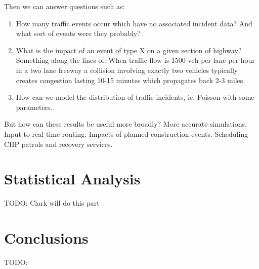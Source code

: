 \documentclass[12pt]{article}
\begin{document}
Then we can answer questions such as:
\begin{enumerate}
    \item How many traffic events occur which have no associated incident
        data? And what sort of events were they probably?
    \item What is the impact of an event of type X on a given section of
        highway? Something along the lines of: When traffic flow is 1500
        veh per lane per hour in a two lane freeway a collision involving
        exactly two vehicles typically creates congestion lasting 10-15
        minutes which propagates back 2-3 miles. 
    \item How can we model the distribution of traffic incidents, ie.
        Poisson with some parameters.
\end{enumerate}

But how can these results be useful more broadly? More accurate
simulations. Input to real time routing. Impacts of planned construction
events. Scheduling CHP patrols and recovery services.

\section{Statistical Analysis}

TODO: Clark will do this part

\section{Conclusions}

TODO:

 


\end{document}
